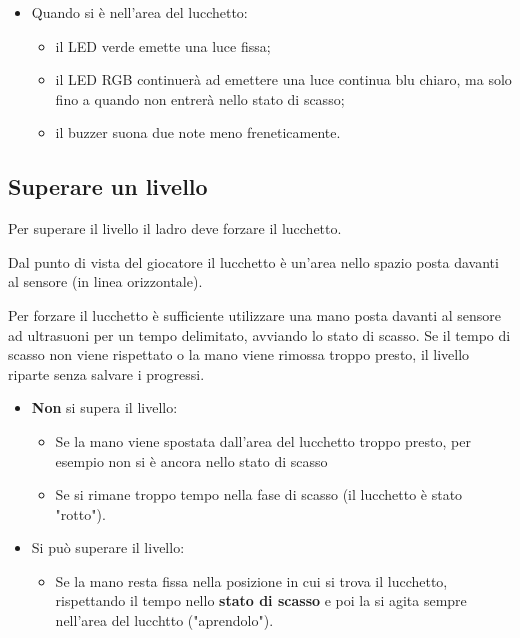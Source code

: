 \begin{itemize}
	\item Quando si è nell'area del lucchetto:
	\begin{itemize}
		\item il LED verde emette una luce fissa;
		\item il LED RGB continuerà ad emettere una luce continua blu chiaro, ma solo fino a quando non entrerà nello stato di scasso;
		\item il buzzer suona due note meno freneticamente.
	\end{itemize}
\end{itemize}

\subsection{Superare un livello}
Per superare il livello il ladro deve forzare il lucchetto.

Dal punto di vista del giocatore il lucchetto è un'area nello spazio posta davanti al sensore (in linea orizzontale).

Per forzare il lucchetto è sufficiente utilizzare una mano posta davanti al sensore ad ultrasuoni per un tempo delimitato, avviando lo stato di scasso. Se il tempo di scasso non viene rispettato o la mano viene rimossa troppo presto, il livello riparte senza salvare i progressi.

\begin{itemize}
	\item \textbf{Non} si supera il livello:
	\begin{itemize}
			\item Se la mano viene spostata dall'area del lucchetto troppo presto, per esempio non si è ancora nello stato di scasso
			\item Se si rimane troppo tempo nella fase di scasso (il lucchetto è stato "rotto").
	\end{itemize}
\end{itemize}

\begin{itemize}
	\item Si può superare il livello:
	\begin{itemize}
			\item Se la mano resta fissa nella posizione in cui si trova il lucchetto, rispettando il tempo nello \textbf{stato di scasso} e poi la si agita sempre nell'area del lucchtto ("aprendolo").
	\end{itemize}
\end{itemize}

